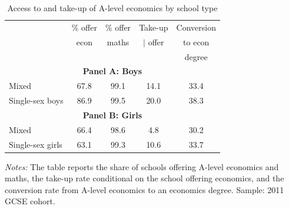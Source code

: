 \begin{table}[htbp]
\centering
\caption{Access to and take-up of A-level economics by school type}
\label{tab:school_type}
\begin{tabular}{l cccc}
\toprule
                              & \% offer   & \% offer   & Take-up    & Conversion \\
                              & econ       & maths      & $|$ offer  & to econ    \\
                              &            &            &            & degree     \\
\midrule
\multicolumn{5}{c}{\textbf{Panel A: Boys}} \\
\midrule
Mixed                         & 67.8         &    99.1      & 14.1         & 33.4         \\
Single-sex boys               & 86.9         & 99.5         & 20.0         & 38.3         \\
\midrule
\multicolumn{5}{c}{\textbf{Panel B: Girls}} \\
\midrule
Mixed                         & 66.4         & 98.6         & 4.8         & 30.2         \\
Single-sex girls              & 63.1         & 99.3         & 10.6         & 33.7         \\
\bottomrule
\end{tabular}
\begin{minipage}{\textwidth}
\smallskip
\footnotesize
\textit{Notes:} The table reports the share of schools offering A-level economics and maths, the take-up rate conditional on the school offering economics, and the conversion rate from A-level economics to an economics degree. Sample: 2011 GCSE cohort.
\end{minipage}
\end{table}
